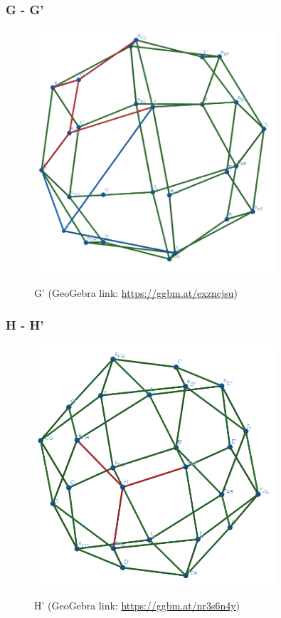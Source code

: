 \documentclass{article}
\begin{document}
\subsubsection{G - G'}
\begin{figure}[H]
\caption{G' (GeoGebra link: \href{https://ggbm.at/exzncjsu}{https://ggbm.at/exzncjsu})}
\centering
\includegraphics[width=0.8\textwidth]{images/cl-07-7.png}
\label{fig:cube7-7}
\end{figure}
\subsubsection{H - H'}
\begin{figure}[H]
\caption{H' (GeoGebra link: \href{https://ggbm.at/nr3s6n4y}{https://ggbm.at/nr3s6n4y})}
\centering
\includegraphics[width=0.8\textwidth]{images/cl-07-8.png}
\label{fig:cube7-8}
\end{figure}
\end{document}
